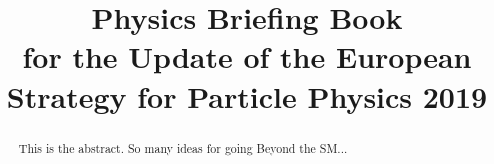 \documentclass[12pt,twoside,a4paper]{cernrep}
\def\bibfiles{\main/bib/chapter,\main/section1/bib/section,\main/section2/bib/section}
\providecommand{\biblio}{\nocite{article-minimal}\clearpage}  %
\begin{document}
\newcommand{\main}{.}
\def\biblio{}

\title{
  Physics Briefing Book \\ 
  {\small for the Update of the European Strategy for Particle Physics 2019}
  }


\maketitle

\begin{abstract}
This is the abstract. So many ideas for going Beyond the SM...
\end{abstract}

\setcounter{tocdepth}{2}
\tableofcontents
\newpage


%









%

\end{document}
